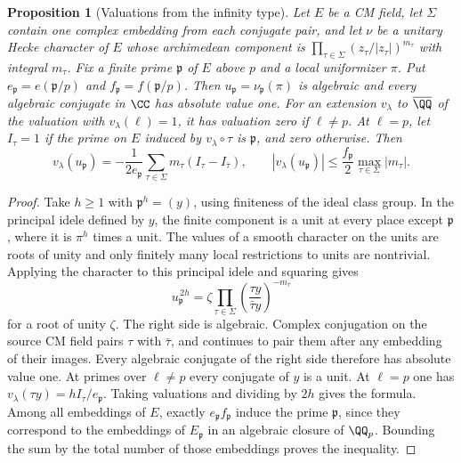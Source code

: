\documentclass[a4paper,11pt]{article}
\newtheorem{proposition}{Proposition}[section]
\theoremstyle{definition}
\theoremstyle{remark}
\numberwithin{equation}{section}
\begin{document}
\begin{proposition}[Valuations from the infinity type]\label{prop:cmplaces335}
Let \(E\) be a CM field, let \(\Sigma\) contain one complex embedding
from each conjugate pair, and let \(\nu\) be a unitary Hecke character
of \(E\) whose archimedean component is
\(\prod_{\tau\in\Sigma}(z_\tau/|z_\tau|)^{m_\tau}\) with integral
\(m_\tau\). Fix a finite prime \(\mathfrak p\) of \(E\) above \(p\)
and a local uniformizer \(\pi\). Put \(e_{\mathfrak p}=e(\mathfrak p/p)\)
and \(f_{\mathfrak p}=f(\mathfrak p/p)\). Then
\(u_{\mathfrak p}=\nu_{\mathfrak p}(\pi)\) is algebraic and every
algebraic conjugate in \(\CC\) has absolute value one. For an extension
\(v_\lambda\) to \(\overline{\QQ}\) of the valuation with
\(v_\lambda(\ell)=1\), it has valuation zero if \(\ell\ne p\).
At \(\ell=p\), let \(I_\tau=1\) if the prime on \(E\) induced by
\(v_\lambda\circ\tau\) is \(\mathfrak p\), and zero otherwise. Then
\[
 v_\lambda(u_{\mathfrak p})
   =-\frac{1}{2e_{\mathfrak p}}\sum_{\tau\in\Sigma}
               m_\tau (I_\tau-I_{\bar\tau}),\qquad
 |v_\lambda(u_{\mathfrak p})|\le
         \frac{f_{\mathfrak p}}2\max_{\tau\in\Sigma}|m_\tau|.
\]
\end{proposition}
\begin{proof}
Take \(h\ge1\) with \(\mathfrak p^h=(y)\), using finiteness of the
ideal class group. In the principal idele defined by \(y\), the finite
component is a unit at every place except \(\mathfrak p\), where it
is \(\pi^h\) times a unit. The values of a smooth character on the
units are roots of unity and only finitely many local restrictions to
units are nontrivial. Applying the character to this principal idele
and squaring gives
\[
       u_{\mathfrak p}^{\,2h}
       =\zeta\prod_{\tau\in\Sigma}
              \left(\frac{\tau y}{\bar\tau y}\right)^{-m_\tau}
\]
for a root of unity \(\zeta\). The right side is algebraic. Complex
conjugation on the source CM field pairs \(\tau\) with \(\bar\tau\),
and continues to pair them after any embedding of their images.
Every algebraic conjugate of the right side therefore has absolute
value one. At primes over \(\ell\ne p\) every conjugate of \(y\)
is a unit. At \(\ell=p\) one has
\(v_\lambda(\tau y)=h I_\tau/e_{\mathfrak p}\). Taking valuations
and dividing by \(2h\) gives the formula. Among all embeddings of
\(E\), exactly \(e_{\mathfrak p}f_{\mathfrak p}\) induce the prime
\(\mathfrak p\), since they correspond to the embeddings of \(E_{\mathfrak p}\)
in an algebraic closure of \(\QQ_p\). Bounding the sum by the total
number of those embeddings proves the inequality.
\end{proof}
\end{document}
